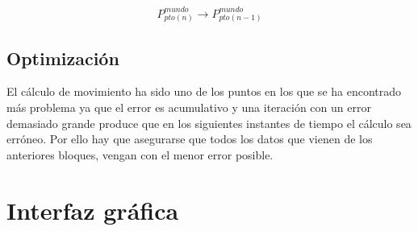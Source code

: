 \begin{equation}
P_{pto(n)}^{mundo}\longrightarrow P_{pto(n-1)}^{mundo}
\end{equation}

\subsection{Optimización}

El cálculo de movimiento ha sido uno de los puntos en los que se ha encontrado más problema ya que el error es acumulativo y una iteración con un error demasiado grande produce que en los siguientes instantes de tiempo el cálculo sea erróneo. Por ello hay que asegurarse que todos los datos que vienen de los anteriores bloques, vengan con el menor error posible.

\section{Interfaz gráfica}